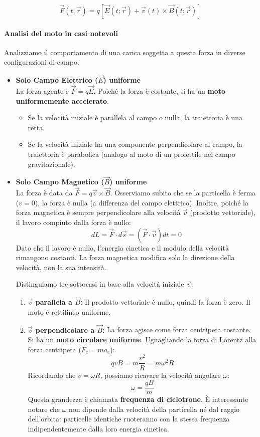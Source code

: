 \documentclass{book}
\begin{document}
$$
\vec{F}(t;\vec{r})=q[\vec{E}(t;\vec{r})+\vec{v}(t) \times \vec{B}(t;\vec{r})]
$$

\paragraph{Analisi del moto in casi notevoli}

Analizziamo il comportamento di una carica soggetta a questa forza in diverse configurazioni di campo.

\begin{itemize}
    \item \textbf{Solo Campo Elettrico ($\vec{E}$) uniforme} \\
    La forza agente è $\vec{F} = q\vec{E}$. Poiché la forza è costante, si ha un \textbf{moto uniformemente accelerato}.
    \begin{itemize}
        \item Se la velocità iniziale è parallela al campo o nulla, la traiettoria è una retta.
        \item Se la velocità iniziale ha una componente perpendicolare al campo, la traiettoria è parabolica (analogo al moto di un proiettile nel campo gravitazionale).
    \end{itemize}

    \item \textbf{Solo Campo Magnetico ($\vec{B}$) uniforme} \\
    La forza è data da $\vec{F}=q\vec{v}\times\vec{B}$.
    Osserviamo subito che se la particella è ferma ($v=0$), la forza è nulla (a differenza del campo elettrico).
    Inoltre, poiché la forza magnetica è sempre perpendicolare alla velocità $\vec{v}$ (prodotto vettoriale), il lavoro compiuto dalla forza è nullo:
    $$
    dL= \vec{F} \cdot d\vec{s} = (\vec{F} \cdot \vec{v}) dt = 0
    $$
    Dato che il lavoro è nullo, l'energia cinetica e il modulo della velocità rimangono costanti. La forza magnetica modifica solo la direzione della velocità, non la sua intensità.

    Distinguiamo tre sottocasi in base alla velocità iniziale $\vec{v}$:
    \begin{enumerate}
        \item \textbf{$\vec{v}$ parallela a $\vec{B}$:} Il prodotto vettoriale è nullo, quindi la forza è zero. Il moto è rettilineo uniforme.
        \item \textbf{$\vec{v}$ perpendicolare a $\vec{B}$:} La forza agisce come forza centripeta costante. Si ha un \textbf{moto circolare uniforme}.
        Uguagliando la forza di Lorentz alla forza centripeta ($F_c = m a_c$):
        $$
        qvB = m \frac{v^2}{R} = m \omega^2 R
        $$
        Ricordando che $v = \omega R$, possiamo ricavare la velocità angolare $\omega$:
        $$
        \omega = \frac{qB}{m}
        $$
        Questa grandezza è chiamata \textbf{frequenza di ciclotrone}. È interessante notare che $\omega$ non dipende dalla velocità della particella né dal raggio dell'orbita: particelle identiche ruoteranno con la stessa frequenza indipendentemente dalla loro energia cinetica.


\end{enumerate}
\end{itemize}
\end{document}
